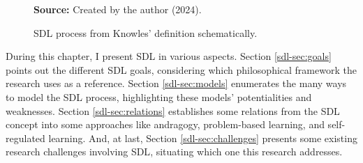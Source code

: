 \begin{figure}[ht!]
\centering

\caption{\textmd{\acrshort{SDL} process from Knowles’ definition schematically.}}
\label{fig:sdl-process}

\par\medskip\ABNTEXfontereduzida\selectfont\textbf{Source:} Created by the author (2024).
\end{figure}

During this chapter, I present \gls{SDL} in various aspects. Section \ref{sdl-sec:goals} points out the different \gls{SDL} goals, considering which philosophical framework the research uses as a reference. Section \ref{sdl-sec:models} enumerates the many ways to model the \gls{SDL} process, highlighting these models’ potentialities and weaknesses. Section \ref{sdl-sec:relations} establishes some relations from the \gls{SDL} concept into some approaches like andragogy, problem-based learning, and self-regulated learning. And, at last, Section \ref{sdl-sec:challenges} presents some existing research challenges involving \gls{SDL}, situating which one this research addresses.
